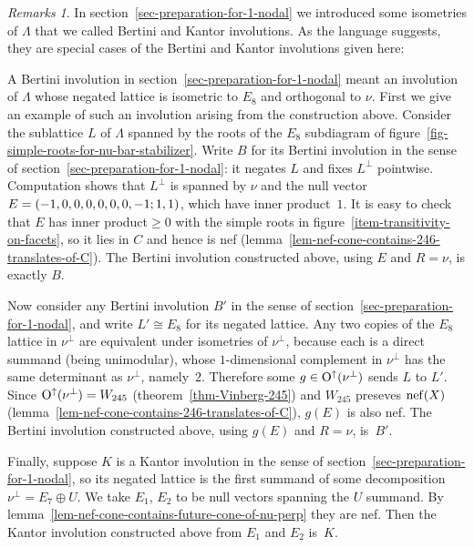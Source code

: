 \documentclass[12pt]{amsart}
\def\nef{\mathop{\rm nef}\nolimits}
\def\Orth{{\rm O}}
\def\Oup{\Orth^{\uparrow}}
\def\iso{\cong}
\numberwithin{theorem}{section}
\numberwithin{equation}{section}
\numberwithin{figure}{section}
\theoremstyle{remark}
\newtheorem*{remarks}{Remarks}
\begin{document}
\begin{remarks}
In section~\ref{sec-preparation-for-1-nodal} we introduced some isometries of $\Lambda$ that we
called Bertini and Kantor involutions.  As the language suggests, they
are special cases of the Bertini and Kantor involutions given here:

A Bertini involution in section~\ref{sec-preparation-for-1-nodal} meant an involution of
$\Lambda$ whose
negated lattice is isometric to $E_8$ and orthogonal to $\nu$.  First
we give an example of such an involution arising from the construction
above.  Consider the sublattice $L$ of $\Lambda$ spanned by the roots
of the $E_8$ subdiagram of figure~\ref{fig-simple-roots-for-nu-bar-stabilizer}.
Write $B$ for its Bertini involution in the sense of section~\ref{sec-preparation-for-1-nodal}:
it negates $L$ and fixes $L^\perp$ pointwise.
Computation shows that $L^\perp$
is spanned by $\nu$ and the null vector $E=(-1,0,0,0,0,0,0,-1;\discretionary{}{}{}1,1)$,
which have inner product~$1$.  It is easy to check that $E$ has inner
product${}\geq0$ with the simple roots in figure~\ref{item-transitivity-on-facets}, so it lies in
$C$ and hence is nef (lemma~\ref{lem-nef-cone-contains-246-translates-of-C}).  The Bertini involution
constructed above, using $E$ and $R=\nu$, is exactly $B$.

Now consider any Bertini involution $B'$ in the sense of
section~\ref{sec-preparation-for-1-nodal}, and write $L'\iso E_8$ for its negated lattice.  Any
two copies of the $E_8$ lattice in $\nu^\perp$ are equivalent under
isometries of $\nu^\perp$, because each is a direct summand (being
unimodular), whose $1$-dimensional complement in $\nu^\perp$ 
has the same determinant as $\nu^\perp$, namely~$2$.  Therefore some
$g\in\Oup(\nu^\perp)$ sends $L$ to $L'$.  Since
$\Oup(\nu^\perp)=W_{245}$ (theorem~\ref{thm-Vinberg-245}) and $W_{245}$ preseves
$\nef(X)$ (lemma~\ref{lem-nef-cone-contains-246-translates-of-C}), $g(E)$ is also nef.   The Bertini
involution constructed above, using $g(E)$ and $R=\nu$, is~$B'$.

Finally, suppose $K$ is a Kantor involution in the sense of section~\ref{sec-preparation-for-1-nodal},
so its negated lattice is the first summand of some decomposition
$\nu^\perp=E_7\oplus U$.  We take $E_1$, $E_2$ to be 
null vectors spanning the $U$ summand.  By lemma~\ref{lem-nef-cone-contains-future-cone-of-nu-perp} they are nef.
Then the Kantor involution constructed above from $E_1$ and $E_2$ is~$K$.
\end{remarks}
\end{document}
